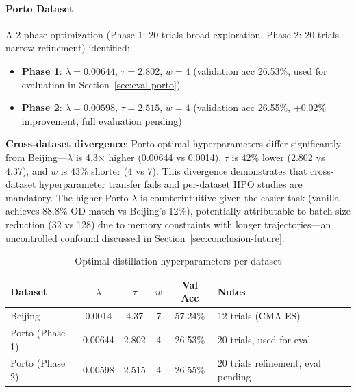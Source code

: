 \paragraph{Porto Dataset}
A 2-phase optimization (Phase 1: 20 trials broad exploration, Phase 2: 20 trials narrow refinement) identified:
\begin{itemize}[leftmargin=*,noitemsep]
    \item \textbf{Phase 1}: $\lambda = 0.00644$, $\tau = 2.802$, $w = 4$ (validation acc 26.53\%, used for evaluation in Section~\ref{sec:eval-porto})
    \item \textbf{Phase 2}: $\lambda = 0.00598$, $\tau = 2.515$, $w = 4$ (validation acc 26.55\%, +0.02\% improvement, full evaluation pending)
\end{itemize}

\textbf{Cross-dataset divergence}: Porto optimal hyperparameters differ significantly from Beijing---$\lambda$ is 4.3$\times$ higher (0.00644 vs 0.0014), $\tau$ is 42\% lower (2.802 vs 4.37), and $w$ is 43\% shorter (4 vs 7). This divergence demonstrates that cross-dataset hyperparameter transfer fails and per-dataset HPO studies are mandatory. The higher Porto $\lambda$ is counterintuitive given the easier task (vanilla achieves 88.8\% OD match vs Beijing's 12\%), potentially attributable to batch size reduction (32 vs 128) due to memory constraints with longer trajectories---an uncontrolled confound discussed in Section~\ref{sec:conclusion-future}.

\begin{table}[h]
    \centering
    \caption{Optimal distillation hyperparameters per dataset}
    \label{tab:distill-hparams}
    \small
    \begin{tabular}{lccccl}
        \toprule
        \textbf{Dataset} & \textbf{$\lambda$} & \textbf{$\tau$} & \textbf{$w$} & \textbf{Val Acc} & \textbf{Notes}                     \\
        \midrule
        Beijing          & 0.0014             & 4.37            & 7            & 57.24\%          & 12 trials (CMA-ES)                 \\
        Porto (Phase 1)  & 0.00644            & 2.802           & 4            & 26.53\%          & 20 trials, used for eval           \\
        Porto (Phase 2)  & 0.00598            & 2.515           & 4            & 26.55\%          & 20 trials refinement, eval pending \\
        \bottomrule
    \end{tabular}
\end{table}

